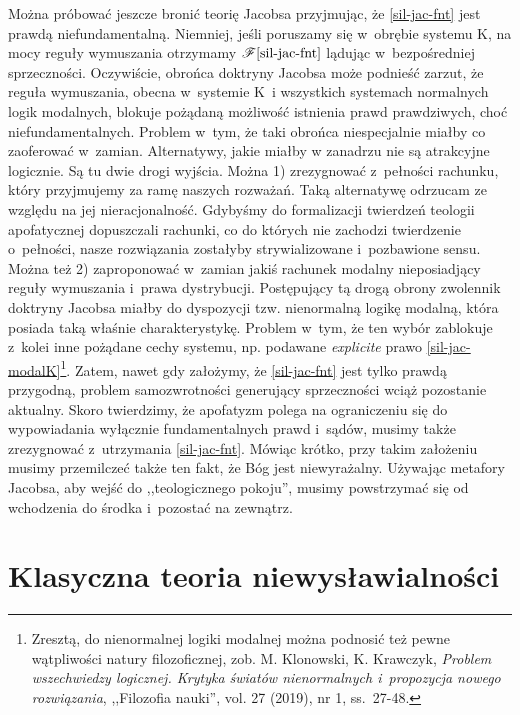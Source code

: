 Można próbować jeszcze bronić teorię Jacobsa przyjmując, że \ref{sil-jac-fnt} jest prawdą niefundamentalną. Niemniej, jeśli poruszamy się w~obrębie systemu K, na mocy reguły wymuszania otrzymamy $\mathscr{F} \eqref{sil-jac-fnt}$ lądując w~bezpośredniej sprzeczności. Oczywiście, obrońca doktryny Jacobsa może podnieść zarzut, że reguła wymuszania, obecna w~systemie K~i wszystkich systemach normalnych logik modalnych, blokuje pożądaną możliwość istnienia prawd prawdziwych, choć niefundamentalnych. Problem w~tym, że taki obrońca niespecjalnie miałby co zaoferować w~zamian. Alternatywy, jakie miałby w zanadrzu nie są atrakcyjne logicznie. Są tu dwie drogi wyjścia. Można 1) zrezygnować z~pełności rachunku, który przyjmujemy za ramę naszych rozważań. Taką alternatywę odrzucam ze względu na jej nieracjonalność. Gdybyśmy do formalizacji twierdzeń teologii apofatycznej dopuszczali rachunki, co do których nie zachodzi twierdzenie o~pełności, nasze rozwiązania zostałyby strywializowane i~pozbawione sensu. Można też 2) zaproponować w~zamian jakiś rachunek modalny nieposiadjący reguły wymuszania i~prawa dystrybucji. Postępujący tą drogą obrony zwolennik doktryny Jacobsa miałby do dyspozycji tzw. nienormalną logikę modalną, która posiada taką właśnie charakterystykę. Problem w~tym, że ten wybór zablokuje z~kolei inne pożądane cechy systemu, np. podawane \textit{explicite} prawo \eqref{sil-jac-modalK}\footnote{Zresztą, do nienormalnej logiki modalnej można podnosić też pewne wątpliwości natury filozoficznej, zob. M. Klonowski, K. Krawczyk, \textit{Problem wszechwiedzy logicznej. Krytyka światów nienormalnych i~propozycja nowego rozwiązania}, ,,Filozofia nauki'', vol. 27 (2019), nr 1, ss.~27-48.}. Zatem, nawet gdy założymy, że \ref{sil-jac-fnt} jest tylko prawdą przygodną, problem samozwrotności generujący sprzeczności wciąż pozostanie aktualny. Skoro twierdzimy, że apofatyzm polega na ograniczeniu się do wypowiadania wyłącznie fundamentalnych prawd i~sądów, musimy także zrezygnować z~utrzymania \ref{sil-jac-fnt}. Mówiąc krótko, przy takim założeniu musimy przemilczeć także ten fakt, że Bóg jest niewyrażalny. Używając metafory Jacobsa, aby wejść do ,,teologicznego pokoju'', musimy powstrzymać się od wchodzenia do środka i~pozostać na zewnątrz.


\chapter{Klasyczna teoria niewysławialności}\label{sil-boch}

